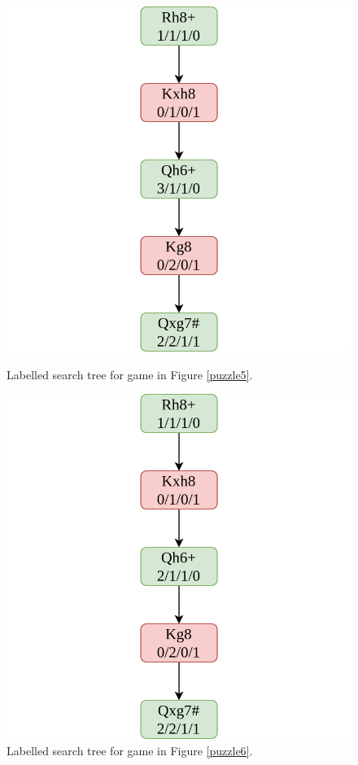 \begin{figure}[H]
  \begin{minipage}{0.475\textwidth}
    \centering
    \includegraphics[width=\textwidth]{project/img/trees/3.drawio.png}
    \caption{Labelled search tree for game in Figure \ref{puzzle5}.}
    \label{tree3}
  \end{minipage}
  \hspace{0.05\textwidth}
  \begin{minipage}{0.475\textwidth}
    \centering
    \includegraphics[width=\textwidth]{project/img/trees/4.drawio.png}
    \caption{Labelled search tree for game in Figure \ref{puzzle6}.}
    \label{tree4}
  \end{minipage}
\end{figure}

